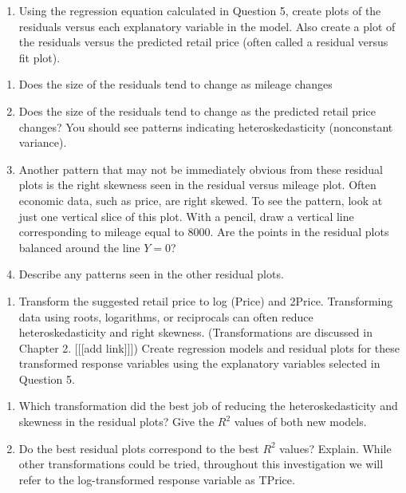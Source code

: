 \documentclass[
]{report}
\providecommand{\tightlist}{%
  \setlength{\itemsep}{0pt}\setlength{\parskip}{0pt}}
\begin{document}
\begin{enumerate}
\def\labelenumi{\arabic{enumi}.}
\setcounter{enumi}{6}
\tightlist
\item
  Using the regression equation calculated in Question 5, create plots of the residuals versus each explanatory variable in the model. Also create a plot of the residuals versus the predicted retail price (often called a residual versus fit plot).
\end{enumerate}

\begin{enumerate}
\def\labelenumi{\alph{enumi}.}
\item
  Does the size of the residuals tend to change as mileage changes
\item
  Does the size of the residuals tend to change as the predicted retail price changes? You should see patterns indicating heteroskedasticity (nonconstant variance).
\item
  Another pattern that may not be immediately obvious from these residual plots is the right skewness seen in the residual versus mileage plot. Often economic data, such as price, are right skewed. To see the pattern, look at just one vertical slice of this plot. With a pencil, draw a vertical line corresponding to mileage equal to 8000. Are the points in the residual plots balanced around the line \(Y = 0\)?
\item
  Describe any patterns seen in the other residual plots.
\end{enumerate}

\begin{enumerate}
\def\labelenumi{\arabic{enumi}.}
\setcounter{enumi}{7}
\tightlist
\item
  Transform the suggested retail price to log (Price) and 2Price. Transforming data using roots, logarithms, or reciprocals can often reduce heteroskedasticity and right skewness. (Transformations are discussed in Chapter 2. {[}{[}{[}add link{]}{]}{]}) Create regression models and residual plots for these transformed response variables using the
  explanatory variables selected in Question 5.
\end{enumerate}

\begin{enumerate}
\def\labelenumi{\alph{enumi}.}
\item
  Which transformation did the best job of reducing the heteroskedasticity and skewness in the residual plots? Give the \(R^2\) values of both new models.
\item
  Do the best residual plots correspond to the best \(R^2\) values? Explain.
  While other transformations could be tried, throughout this investigation we will refer to the log-transformed response variable as TPrice.
\end{enumerate}
\end{document}
